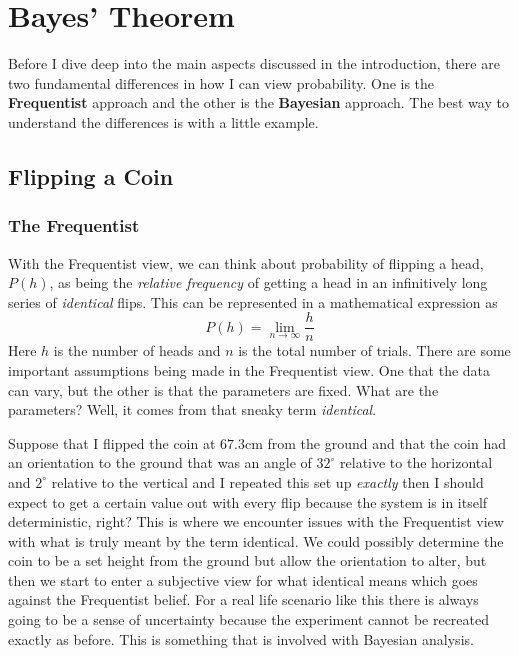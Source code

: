 \documentclass[12pt,twoside]{report}   %
\begin{document}
\newpage
\pagestyle{fancy}
\renewcommand{\chaptermark}[1]{ \markboth{#1}{} }
\renewcommand{\sectionmark}[1]{ \markright{#1}{} }
\fancyfoot{}
\fancyhead[RO,LE]{\thepage}
\fancyhead[LO]{\thesection\,\,\rightmark}
\fancyhead[RE]{\thechapter\,\,\leftmark}
\chapter{Bayes' Theorem}\label{Bayes' Theorem}

Before I dive deep into the main aspects discussed in the introduction, there are two fundamental differences in how I can view probability. One is the \textbf{Frequentist} approach and the other is the \textbf{Bayesian} approach. The best way to understand the differences is with a little example.

\section{Flipping a Coin}\label{Flipping a Coin}

\subsection{The Frequentist}\label{The Frequentist}

With the Frequentist view, we can think about probability of flipping a head, $P(h)$, as being the \textit{relative frequency} of getting a head in an infinitively long series of \textit{identical} flips. This can be represented in a mathematical expression as
$$P(h) = \lim_{n\to\infty} \frac{h}{n}$$
Here $h$ is the number of heads and $n$ is the total number of trials. There are some important assumptions being made in the Frequentist view. One that the data can vary, but the other is that the parameters are fixed. What are the parameters? Well, it comes from that sneaky term \textit{identical}.

Suppose that I flipped the coin at $67.3$cm from the ground and that the coin had an orientation to the ground that was an angle of $32^{\circ}$ relative to the horizontal and $2^{\circ}$ relative to the vertical and I repeated this set up \textit{exactly} then I should expect to get a certain value out with every flip because the system is in itself deterministic, right? This is where we encounter issues with the Frequentist view with what is truly meant by the term identical. We could possibly determine the coin to be a set height from the ground but allow the orientation to alter, but then we start to enter a subjective view for what identical means which goes against the Frequentist belief. For a real life scenario like this there is always going to be a sense of uncertainty because the experiment cannot be recreated exactly as before. This is something that is involved with Bayesian analysis.
\end{document}
